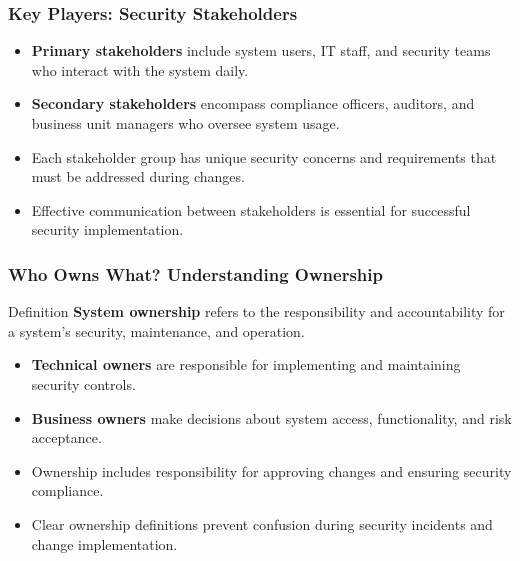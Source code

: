 \documentclass{beamer}
\begin{document}
    \begin{frame}
    \frametitle{Key Players: Security Stakeholders}
    \begin{itemize}
        \item \textbf{Primary stakeholders} include system users, IT staff, and security teams who interact with the system daily.
        
        \item \textbf{Secondary stakeholders} encompass compliance officers, auditors, and business unit managers who oversee system usage.
        
        \item Each stakeholder group has unique security concerns and requirements that must be addressed during changes.
        
        \item Effective communication between stakeholders is essential for successful security implementation.
    \end{itemize}
    \end{frame}
    
    \begin{frame}
    \frametitle{Who Owns What? Understanding Ownership}
    \begin{block}{Definition}
    \textbf{System ownership} refers to the responsibility and accountability for a system's security, maintenance, and operation.
    \end{block}
    \begin{itemize}
        \item \textbf{Technical owners} are responsible for implementing and maintaining security controls.
        
        \item \textbf{Business owners} make decisions about system access, functionality, and risk acceptance.
        
        \item Ownership includes responsibility for approving changes and ensuring security compliance.
        
        \item Clear ownership definitions prevent confusion during security incidents and change implementation.
    \end{itemize}
    \end{frame}
    
\end{document}
